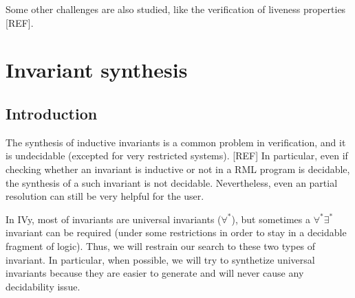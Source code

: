 \documentclass[11pt,a4paper,oldfontcommands]{memoir}
\begin{document}
    Some other challenges are also studied, like the verification of liveness properties [REF].


\chapter{Invariant synthesis}

    \section{Introduction}

    The synthesis of inductive invariants is a common problem in verification, and it is undecidable (excepted for very restricted systems). [REF]
    In particular, even if checking whether an invariant is inductive or not in a RML program is decidable, the synthesis of a such invariant is not decidable.
    Nevertheless, even an partial resolution can still be very helpful for the user.

    In IVy, most of invariants are universal invariants (\(\forall^*\)), but sometimes a \(\forall^*\exists^*\) invariant can be required (under some restrictions in order
    to stay in a decidable fragment of logic). Thus, we will restrain our search to these two types of invariant.
    In particular, when possible, we will try to synthetize universal invariants because they are easier to generate and will never cause any decidability issue.
    
\end{document}
